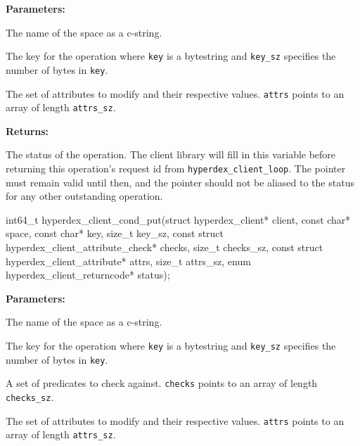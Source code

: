 \noindent\textbf{Parameters:}
\begin{description}[labelindent=\widthof{{\texttt{attrs}, \texttt{attrs\_sz}}},leftmargin=*,noitemsep,nolistsep,align=right]
\item[\texttt{space}] The name of the space as a c-string.
\item[\texttt{key}, \texttt{key\_sz}] The key for the operation where \texttt{key} is a bytestring and \texttt{key\_sz} specifies the number of bytes in \texttt{key}.
\item[\texttt{attrs}, \texttt{attrs\_sz}] The set of attributes to modify and their respective values.  \texttt{attrs} points to an array of length \texttt{attrs\_sz}.
\end{description}

\noindent\textbf{Returns:}
\begin{description}[labelindent=\widthof{{\texttt{status}}},leftmargin=*,noitemsep,nolistsep,align=right]
\item[\texttt{status}] The status of the operation.  The client library will fill in this variable before returning this operation's request id from \texttt{hyperdex\_client\_loop}.  The pointer must remain valid until then, and the pointer should not be aliased to the status for any other outstanding operation.
\end{description}

\funcsep
{}
\begin{ccode}
int64_t hyperdex_client_cond_put(struct hyperdex_client* client,
                const char* space,
                const char* key, size_t key_sz,
                const struct hyperdex_client_attribute_check* checks, size_t checks_sz,
                const struct hyperdex_client_attribute* attrs, size_t attrs_sz,
                enum hyperdex_client_returncode* status);
\end{ccode}
\funcdesc 

\noindent\textbf{Parameters:}
\begin{description}[labelindent=\widthof{{\texttt{checks}, \texttt{checks\_sz}}},leftmargin=*,noitemsep,nolistsep,align=right]
\item[\texttt{space}] The name of the space as a c-string.
\item[\texttt{key}, \texttt{key\_sz}] The key for the operation where \texttt{key} is a bytestring and \texttt{key\_sz} specifies the number of bytes in \texttt{key}.
\item[\texttt{checks}, \texttt{checks\_sz}] A set of predicates to check against.  \texttt{checks} points to an array of length \texttt{checks\_sz}.
\item[\texttt{attrs}, \texttt{attrs\_sz}] The set of attributes to modify and their respective values.  \texttt{attrs} points to an array of length \texttt{attrs\_sz}.
\end{description}

